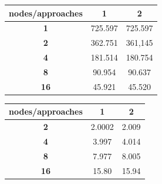 \documentclass[a4paper]{article}
\begin{document}
\enspace

\begin{minipage}[b]{.40\textwidth}
  \centering
\begin{tabular}{c|c|c}
\textbf{nodes/approaches} & \textbf{1} & \textbf{2} \\ \hline
\textbf{1}                & 725.597    & 725.597    \\ \hline
\textbf{2}                & 362.751    & 361,145    \\ \hline
\textbf{4}                & 181.514    & 180.754    \\ \hline
\textbf{8}                & 90.954     & 90.637     \\ \hline
\textbf{16}               & 45.921     & 45.520    
\end{tabular}
  \label{tab:t_app3}
\end{minipage} \qquad
\begin{minipage}[b]{.40\textwidth}
  \centering
\begin{tabular}{c|c|c}
\textbf{nodes/approaches} & \textbf{1} & \textbf{2} \\ \hline
\textbf{2}                & 2.0002     & 2.009      \\ \hline
\textbf{4}                & 3.997      & 4.014      \\ \hline
\textbf{8}                & 7.977      & 8.005      \\ \hline
\textbf{16}               & 15.80      & 15.94     
\end{tabular}
  \label{tab:t_app4}
\end{minipage}
\end{document}

